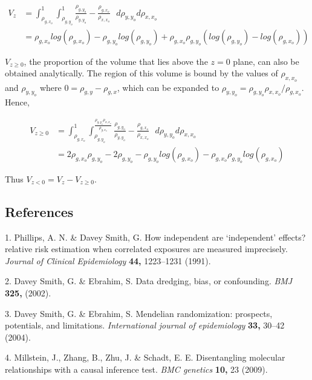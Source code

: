 \documentclass[]{article}
\begin{document}
\[
\begin{aligned}
V_z & = \int^1_{\rho_{g,x_o}} \int^1_{\rho_{g,y_o}} \frac{\rho_{g,y_o}}{\rho_{y,y_o}} - \frac{\rho_{g,x_o}}{\rho_{x,x_o}}\,\,\,\, d\rho_{y,y_o}d\rho_{x,x_o} \\
& = \rho_{g,x_o}log(\rho_{g,x_o}) - \rho_{g,y_o}log(\rho_{g,y_o}) + \rho_{g,x_o}\rho_{g,y_o}(log(\rho_{g,y_o})-log(\rho_{g,x_o}))
\end{aligned}
\]

\(V_{z \ge 0}\), the proportion of the volume that lies above the
\(z=0\) plane, can also be obtained analytically. The region of this
volume is bound by the values of \(\rho_{x,x_o}\) and \(\rho_{y,y_o}\)
where \(0 = \rho_{g,y} - \rho_{g,x}\), which can be expanded to
\(\rho_{y,y_o} = \rho_{g,y_o}\rho_{x,x_o} / \rho_{g,x_o}\). Hence,

\[
\begin{aligned}
V_{z \ge 0} & = \int^1_{\rho_{g,x_o}} \int^{\frac{\rho_{g,y_o}\rho_{x,x_o}}{\rho_{g,x_o}}}_{\rho_{g,y_o}} \frac{\rho_{g,y_o}}{\rho_{y,y_o}} - \frac{\rho_{g,x_o}}{\rho_{x,x_o}}\,\,\,\, d\rho_{y,y_o}d\rho_{x,x_o} \\
& = 2\rho_{g,x_o}\rho_{g,y_o} - 2\rho_{g,y_o} - \rho_{g,y_o}log(\rho_{g,x_o}) - \rho_{g,x_o}\rho_{g,y_o}log(\rho_{g,x_o})
\end{aligned}
\]

Thus \(V_{z < 0} = V_{z} - V_{z \geq 0}\).

\newpage

\subsection*{References}\label{references}

\hypertarget{refs}{}
\hypertarget{ref-Phillips1991}{}
1. Phillips, A. N. \& Davey Smith, G. How independent are `independent'
effects? relative risk estimation when correlated exposures are measured
imprecisely. \emph{Journal of Clinical Epidemiology} \textbf{44,}
1223--1231 (1991).

\hypertarget{ref-DaveySmith2002}{}
2. Davey Smith, G. \& Ebrahim, S. Data dredging, bias, or confounding.
\emph{BMJ} \textbf{325,} (2002).

\hypertarget{ref-DaveySmith2004}{}
3. Davey Smith, G. \& Ebrahim, S. Mendelian randomization: prospects,
potentials, and limitations. \emph{International journal of
epidemiology} \textbf{33,} 30--42 (2004).

\hypertarget{ref-Millstein2009}{}
4. Millstein, J., Zhang, B., Zhu, J. \& Schadt, E. E. Disentangling
molecular relationships with a causal inference test. \emph{BMC
genetics} \textbf{10,} 23 (2009).
\end{document}
